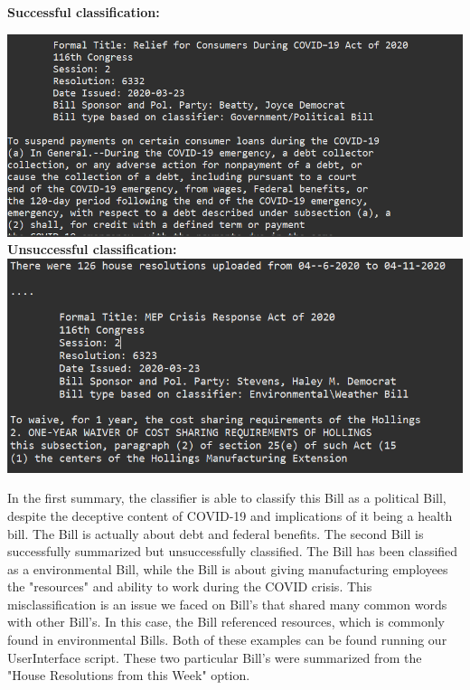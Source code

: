 \documentclass[11pt,a4paper]{article}
\begin{document}
 
 \noindent\textbf{Successful classification:}

 \noindent\includegraphics[scale=.54]{figs/Screenshot2.PNG}
 \newlinenewline\noindent\textbf{Unsuccessful classification:}
  \newline
  \includegraphics[scale=.57]{figs/Screenshot3.PNG}
  \newline
  
    In the first summary, the classifier is able to classify this Bill as a political Bill, despite the deceptive content of COVID-19 and implications of it being a health bill. The Bill is actually about debt and federal benefits.
  The second Bill is successfully summarized but unsuccessfully classified. The Bill has been classified as a environmental Bill, while the Bill is about giving manufacturing employees the "resources" and ability to work during the COVID crisis. This misclassification is an issue we faced on Bill's that shared many common words with other Bill's. In this case, the Bill referenced resources, which is commonly found in environmental Bills. Both of these examples can be found running our UserInterface script. These two particular Bill's were summarized from the "House Resolutions from this Week" option.
\end{document}

